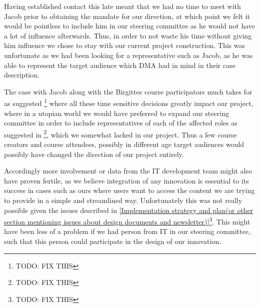 Having established contact this late meant that we had no time to meet with Jacob prior to obtaining the mandate for our direction, at which point we felt it would be pointless to include him in our steering committee as he would not have a lot of influence afterwards. Thus, in order to not waste his time without giving him influence we chose to stay with our current project construction. This was unfortunate as we had been looking for a representative such as Jacob, as he was able to represent the target audience which DMA had in mind in their case description.

The case with Jacob along with the Birgittes course participators much takes for as suggested \cite{THE KEY TO SUCCESS IN INNOVATION}\footnote{TODO: FIX THIS} where all these time sensitive decisions greatly impact our project, where in a utopian world we would have preferred to expand our steering committee in order to include representatives of each of the affected roles as suggested in \cite{callon}\footnote{TODO: FIX THIS}, which we somewhat lacked in our project. Thus a few course creators and course attendees, possibly in different age target audiences would possibly have changed the direction of our project entirely.

Accordingly more involvement or data from the IT development team might also have proven fertile, as we believe integration of any innovation is essential to its success in cases such as ours where users want to access the content we are trying to provide in a simple and streamlined way. Unfortunately this was not really possible given the issues described in \ref{Implementation strategy and plan(or other section mentioning issues about design documents and newsletter)}\footnote{TODO: FIX THIS}. This might have been less of a problem if we had person from IT in our steering committee, such that this person could participate in the design of our innovation.